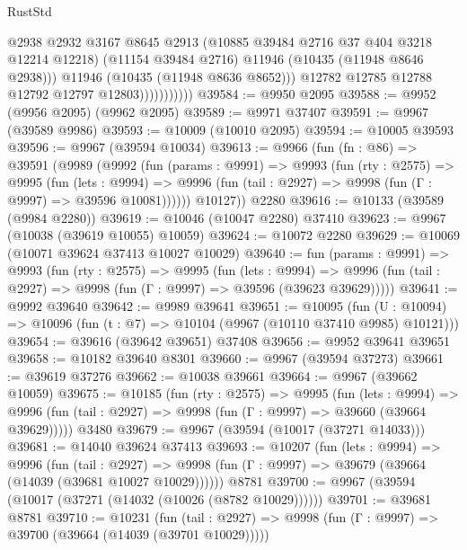 \begin{lexlean}{RustStd}
\begin{coremodule}
                              @2938
                              @2932
                              @3167
                              @8645
                              @2913
                              (@10885 @39484 @2716 @37 @404 @3218 @12214 @12218)
                              (@11154 @39484 @2716)
                              @11946
                              (@10435 (@11948 @8646 @2938)))
                            @11946
                            (@10435 (@11948 @8636 @8652)))
                          @12782
                          @12785
                          @12788
                          @12792
                          @12797
                          @12803)))))))))))
@39584 := @9950 @2095
@39588 := @9952 (@9956 @2095) (@9962 @2095)
@39589 := @9971 @37407
@39591 := @9967 (@39589 @9986)
@39593 := @10009 (@10010 @2095)
@39594 := @10005 @39593
@39596 := @9967 (@39594 @10034)
@39613 := @9966
    (fun (fn : @86) =>
    @39591
      (@9989
        (@9992
          (fun (params : @9991) =>
          @9993
            (fun (rty : @2575) =>
            @9995
              (fun (lets : @9994) =>
              @9996 (fun (tail : @2927) => @9998 (fun (Γ : @9997) => @39596 @10081))))))
        @10127))
    @2280
@39616 := @10133 (@39589 (@9984 @2280))
@39619 := @10046 (@10047 @2280) @37410
@39623 := @9967 (@10038 (@39619 @10055) @10059)
@39624 := @10072 @2280
@39629 := @10069 (@10071 @39624 @37413 @10027 @10029)
@39640 := fun (params : @9991) =>
  @9993
    (fun (rty : @2575) =>
    @9995
      (fun (lets : @9994) =>
      @9996 (fun (tail : @2927) => @9998 (fun (Γ : @9997) => @39596 (@39623 @39629)))))
@39641 := @9992 @39640
@39642 := @9989 @39641
@39651 := @10095
    (fun (U : @10094) => @10096 (fun (t : @7) => @10104 (@9967 (@10110 @37410 @9985) @10121)))
@39654 := @39616 (@39642 @39651) @37408
@39656 := @9952 @39641 @39651
@39658 := @10182 @39640 @8301
@39660 := @9967 (@39594 @37273)
@39661 := @39619 @37276
@39662 := @10038 @39661
@39664 := @9967 (@39662 @10059)
@39675 := @10185
    (fun (rty : @2575) =>
    @9995
      (fun (lets : @9994) =>
      @9996 (fun (tail : @2927) => @9998 (fun (Γ : @9997) => @39660 (@39664 @39629)))))
    @3480
@39679 := @9967 (@39594 (@10017 (@37271 @14033)))
@39681 := @14040 @39624 @37413
@39693 := @10207
    (fun (lets : @9994) =>
    @9996
      (fun (tail : @2927) =>
      @9998 (fun (Γ : @9997) => @39679 (@39664 (@14039 (@39681 @10027 @10029))))))
    @8781
@39700 := @9967 (@39594 (@10017 (@37271 (@14032 (@10026 (@8782 @10029))))))
@39701 := @39681 @8781
@39710 := @10231
    (fun (tail : @2927) => @9998 (fun (Γ : @9997) => @39700 (@39664 (@14039 (@39701 @10029)))))

\end{coremodule}
\end{lexlean}
